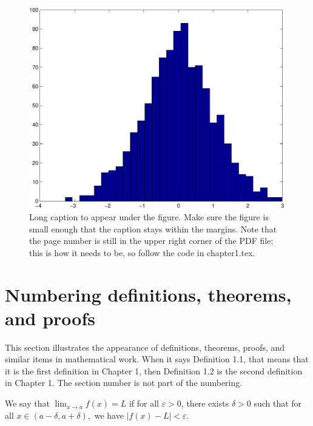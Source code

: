 \begin{landscape}
\thispagestyle{lscape}
\pagestyle{lscape}
  \begin{figure}
    \includegraphics[width=\linewidth,height=\textheight-1in]{figures/figure.pdf}
    \caption[Short caption for List of Figures]{Long caption to appear under the figure.  Make sure the figure is small enough that the caption stays within the margins.  Note that the page number is still in the upper right corner of the PDF file; this is how it needs to be, so follow the code in chapter1.tex.}
  \end{figure}
\end{landscape}

\section{Numbering definitions, theorems, and proofs}
This section illustrates the appearance of definitions, theorems, proofs, and similar items in mathematical work.
When it says Definition 1.1, that means that it is the first definition in Chapter 1, then Definition 1.2 is the second definition in Chapter 1.
The section number is not part of the numbering.

\pagebreak  %

\begin{definition}
We say that $\lim_{x \to a} f(x) = L$ if for all $\varepsilon > 0$, there exists $\delta > 0$ such that for all $x \in (a-\delta,a+\delta),$ we have $|f(x) - L| < \varepsilon$.
\end{definition}

